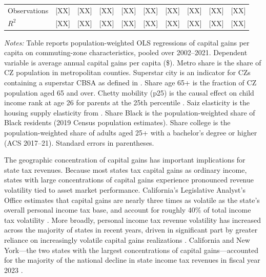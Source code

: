 \documentclass[12pt]{article}
\begin{document}
\begin{table}[H]
\begin{tabular}{l*{9}{c}}
\midrule
Observations         & [XX]   & [XX]   & [XX]   & [XX]   & [XX]   & [XX]   & [XX]   & [XX]   & [XX]   \\
$R^2$                & [XX]   & [XX]   & [XX]   & [XX]   & [XX]   & [XX]   & [XX]   & [XX]   & [XX]   \\
\bottomrule
\end{tabular}
\begin{minipage}{0.95\textwidth}
\vspace{0.5em}
\footnotesize
\textit{Notes:} Table reports population-weighted OLS regressions of capital gains per capita on commuting-zone characteristics, pooled over 2002--2021. Dependent variable is average annual capital gains per capita (\$). Metro share is the share of CZ population in metropolitan counties. Superstar city is an indicator for CZs containing a superstar CBSA as defined in \citet{gyourko2013superstar}. Share age 65+ is the fraction of CZ population aged 65 and over. Chetty mobility (p25) is the causal effect on child income rank at age 26 for parents at the 25th percentile \citep{chetty2014land}. Saiz elasticity is the housing supply elasticity from \citet{saiz2010geographic}. Share Black is the population-weighted share of Black residents (2019 Census population estimates). Share college is the population-weighted share of adults aged 25+ with a bachelor's degree or higher (ACS 2017--21). Standard errors in parentheses.
\end{minipage}
\end{table}


The geographic concentration of capital gains has important implications for state tax revenues. Because most states tax capital gains as ordinary income, states with large concentrations of capital gains experience pronounced revenue volatility tied to asset market performance. California's Legislative Analyst's Office estimates that capital gains are nearly three times as volatile as the state's overall personal income tax base, and account for roughly 40\% of total income tax volatility \citep{lao2017volatility}. More broadly, personal income tax revenue volatility has increased across the majority of states in recent years, driven in significant part by greater reliance on increasingly volatile capital gains realizations \citep{robyn2024volatility}. California and New York---the two states with the largest concentrations of capital gains---accounted for the majority of the national decline in state income tax revenues in fiscal year 2023 \citep{robyn2024volatility}. 
\end{document}
